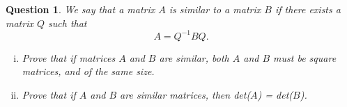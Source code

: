 \documentclass[12pt]{article}
\newtheorem{question}[thm]{Question}
\begin{document}
\begin{question}
	\normalfont We say that a matrix $A$ is \emph{similar} to a matrix $B$ if there exists a matrix $Q$ such that 
	\[
	A = Q^{-1}BQ.
	\]
	\vspace{.1cm}
	\begin{enumerate}[(i)]
	\item Prove that if matrices $A$ and $B$ are similar, both $A$ and $B$ must be square matrices, and of the same size. 
	\vspace{.1cm}
	
\item	Prove that if $A$ and $B$ are similar matrices, then det($A$) = det($B$). 
	\end{enumerate}
		
	\end{question}




\vspace{1cm}
\end{document}
